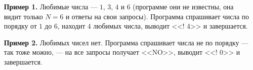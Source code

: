 \textbf{Пример 1.} Любимые числа --- $1$, $3$, $4$ и $6$ (программе они не известны, она видит только $N = 6$ и ответы на свои запросы). Программа спрашивает числа по порядку от $1$ до $6$, находит $4$ любимых числа, выводит <<! 4>> и завершается.

\textbf{Пример 2.} Любимых чисел нет. Программа спрашивает числа не по порядку --- так тоже можно, --- на все запросы получает <<NO>>, выводит <<! 0>> и завершается.

